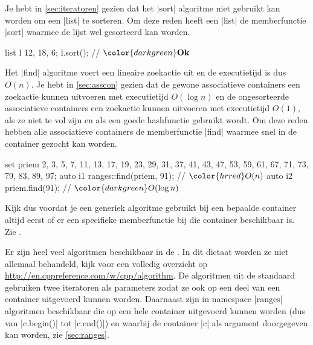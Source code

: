 \begin{cpplstShortInline}
Je hebt in \cref{sec:iteratoren} gezien dat het |sort| algoritme niet gebruikt kan worden om een |list| te sorteren.
Om deze reden heeft een |list| de memberfunctie |sort| waarmee de lijst wel gesorteerd kan worden.

\begin{cpplstfragment}[mathescape=true]
list l {12, 18, 6};
l.sort(); // $\color{darkgreen}\textbf{Ok}$
\end{cpplstfragment}

Het |find| algoritme voert een lineaire zoekactie uit en de executietijd is dus $O(n)$.
Je hebt in \cref{sec:asscon} gezien dat de gewone associatieve containers een zoekactie kunnen uitvoeren met executietijd $O(\log{n})$ en de ongesorteerde associatieve containers een zoekactie kunnen uitvoeren met executietijd $O(1)$, als ze niet te vol zijn en als een goede hashfunctie gebruikt wordt.
Om deze reden hebben alle associatieve containers de memberfunctie |find| waarmee snel in de container gezocht kan worden.

\begin{cpplstfragment}[mathescape=true]
set priem {2, 3, 5, 7, 11, 13, 17, 19, 23, 29, 31, 37, 41, 43, 47, 53, 59, 61, 67, 71, 73, 79, 83, 89, 97};
auto i1 {ranges::find(priem, 91)}; // $\color{hrred}O(n)$
auto i2 {priem.find(91)}; // $\color{darkgreen}O(\log{n})$
\end{cpplstfragment}

Kijk dus voordat je een generiek algoritme gebruikt bij een bepaalde container altijd eerst of er een specifieke memberfunctie bij die container beschikbaar is.\\Zie {}.

Er zijn heel veel algoritmen beschikbaar in de \Cpp{} .
In dit dictaat worden ze niet allemaal behandeld, kijk voor een volledig overzicht op \url{http://en.cppreference.com/w/cpp/algorithm}.
De algoritmen uit de standaard \Cpp{}  gebruiken twee iteratoren als parameters zodat ze ook op een deel van een container uitgevoerd kunnen worden.
Daarnaast zijn in namespace |ranges| algoritmen beschikbaar die op een hele container uitgevoerd kunnen worden (dus van |c.begin()| tot |c.end()|) en waarbij de container |c| als argument doorgegeven kan worden, zie \cref{sec:ranges}.


\end{cpplstShortInline}
